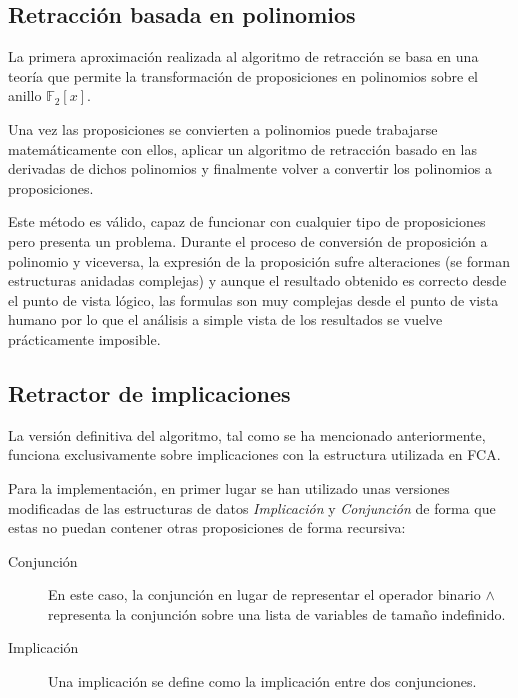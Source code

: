 \subsection*{Retracción basada en polinomios}

	La primera aproximación realizada al algoritmo de retracción se basa en una teoría que permite la transformación de proposiciones en polinomios sobre el anillo $\mathbb{F}_2[x]$. 
	

	Una vez las proposiciones se convierten a polinomios puede trabajarse matemáticamente con ellos, aplicar un algoritmo de retracción basado en las derivadas de dichos polinomios y finalmente volver a convertir los polinomios a proposiciones.
	
	Este método es válido, capaz de funcionar con cualquier tipo de proposiciones pero presenta un problema. Durante el proceso de conversión de proposición a polinomio y viceversa, la expresión de la proposición sufre alteraciones (se forman estructuras anidadas complejas) y aunque el resultado obtenido es correcto desde el punto de vista lógico, las formulas son muy complejas desde el punto de vista humano por lo que el análisis a simple vista de los resultados se vuelve prácticamente imposible.
	
	
\subsection*{Retractor de implicaciones}
	
	La versión definitiva del algoritmo, tal como se ha mencionado anteriormente, funciona exclusivamente sobre implicaciones con la estructura utilizada en FCA.
	
	Para la implementación, en primer lugar se han utilizado unas versiones modificadas de las estructuras de datos \textit{Implicación} y \textit{Conjunción} de forma que estas no puedan contener otras proposiciones de forma recursiva:
	
	\begin{description}
		\item[Conjunción] En este caso, la conjunción en lugar de representar el operador binario $\wedge$ representa la conjunción sobre una lista de variables de tamaño indefinido.
		\item[Implicación] Una implicación se define como la implicación entre dos conjunciones.
	\end{description}

